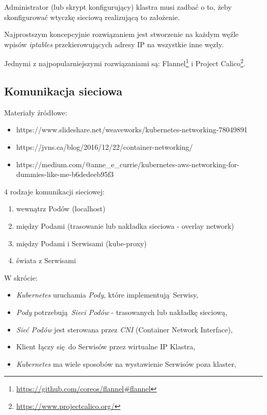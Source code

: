 \documentclass[a4paper,12pt,twoside,openany]{report}
\providecommand{\tightlist}{%
  \setlength{\itemsep}{0pt}\setlength{\parskip}{0pt}}
\DeclareRobustCommand{\href}[2]{#2\footnote{\url{#1}}}
\begin{document}
Administrator (lub skrypt konfigurujący) klastra musi zadbać o to, żeby
skonfigurować wtyczkę sieciową realizującą to założenie.

Najprostszym koncepcyjnie rozwiązaniem jest stworzenie na każdym węźle
wpisów \emph{iptables} przekierowujących adresy IP na wszystkie inne
węzły.

Jednymi z najpopularniejszymi rozwiązaniami są:
\href{https://github.com/coreos/flannel\#flannel}{Flannel} i
\href{https://www.projectcalico.org/}{Project Calico}.

\hypertarget{komunikacja-sieciowa}{%
\subsection{Komunikacja sieciowa}\label{komunikacja-sieciowa}}

Materiały źródłowe:

\begin{itemize}
\tightlist
\item
  https://www.slideshare.net/weaveworks/kubernetes-networking-78049891
\item
  https://jvns.ca/blog/2016/12/22/container-networking/
\item
  https://medium.com/@anne\_e\_currie/kubernetes-aws-networking-for-dummies-like-me-b6dedeeb95f3
\end{itemize}

4 rodzaje komunikacji sieciowej:

\begin{enumerate}
\def\labelenumi{\arabic{enumi}.}
\tightlist
\item
  wewnątrz Podów (localhost)
\item
  między Podami (trasowanie lub nakładka sieciowa - overlay network)
\item
  między Podami i Serwisami (kube-proxy)
\item
  świata z Serwisami
\end{enumerate}

W skrócie:

\begin{itemize}
\tightlist
\item
  \emph{Kubernetes} uruchamia \emph{Pody}, które implementują~Serwisy,
\item
  \emph{Pody} potrzebują~\emph{Sieci Podów} - trasowanych lub nakładkę
  sieciową,
\item
  \emph{Sieć Podów} jest sterowana przez \emph{CNI} (Container Network
  Interface),
\item
  Klient łączy się~do Serwisów przez wirtualne IP Klastra,
\item
  \emph{Kubernetes} ma wiele sposobów na wystawienie Serwisów poza
  klaster,
\end{itemize}
\end{document}
